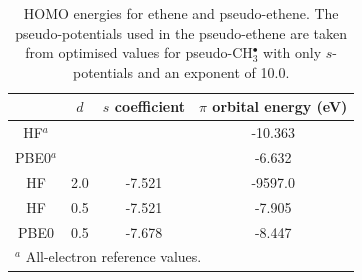 \documentclass[journal=jctcce,manuscript=article]{achemso}
\begin{document}

\begin{table}[ht]
\caption{HOMO energies for ethene and pseudo-ethene. The pseudo-potentials used in the pseudo-ethene are taken from optimised values for 
pseudo-CH\(^{\bullet}_{3}\) with only \(s\)-potentials and an exponent of 10.0.}
\begin{tabular}{c c c c}
\hline
& $d$ & \(s\) coefficient & \( \pi \) orbital energy (eV) \\
\hline
HF$^a$   &     &        & -10.363 \\
PBE0$^a$ &     &        & -6.632 \\
HF       & 2.0 & -7.521 & -9597.0 \\
HF       & 0.5 & -7.521  & -7.905 \\
PBE0     & 0.5 &-7.678  & -8.447 \\
\hline
\multicolumn{4}{l}{$^a$ All-electron reference values.}\\
\end{tabular}
\label{table:ethene_s_pseudo}
\end{table}
\end{document}
